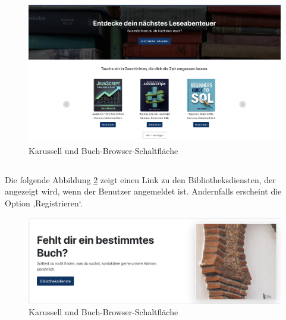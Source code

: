 \begin{figure}[H]
	\centering
	\includegraphics[width=1.0\textwidth]{images/UI-screenshots/Carousel_and_BookBrowser.png}%
	\caption{Karussell und Buch-Browser-Schaltfläche}
	\label{fig:Carousel_and_BookBrowser}%
\end{figure}

\subsection*{}

Die folgende Abbildung \ref{fig:Bibliotheksdienste-Link} zeigt einen Link zu den Bibliotheksdiensten, der angezeigt wird, wenn der Benutzer angemeldet ist. Andernfalls erscheint die Option ‚Registrieren‘.

\begin{figure}[H]
	\centering
	\includegraphics[width=1.0\textwidth]{images/UI-screenshots/Bibliotheksdienste-Link.png}%
	\caption{Karussell und Buch-Browser-Schaltfläche}
	\label{fig:Bibliotheksdienste-Link}%
\end{figure}

